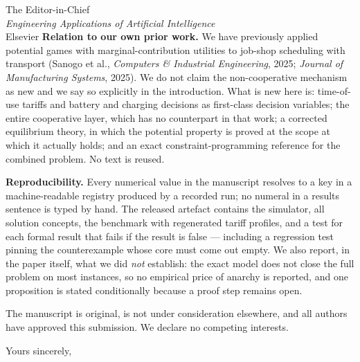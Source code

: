 \documentclass[11pt]{letter}
\begin{document}
\begin{letter}{The Editor-in-Chief\\\textit{Engineering Applications of Artificial Intelligence}\\Elsevier}
\textbf{Relation to our own prior work.} We have previously applied potential games with
marginal-contribution utilities to job-shop scheduling with transport (Sanogo et al.,
\textit{Computers \& Industrial Engineering}, 2025; \textit{Journal of Manufacturing
Systems}, 2025). We do not claim the non-cooperative mechanism as new and we say so
explicitly in the introduction. What is new here is: time-of-use tariffs and battery and
charging decisions as first-class decision variables; the entire cooperative layer, which has
no counterpart in that work; a corrected equilibrium theory, in which the potential property
is proved at the scope at which it actually holds; and an exact constraint-programming
reference for the combined problem. No text is reused.

\textbf{Reproducibility.} Every numerical value in the manuscript resolves to a key in a
machine-readable registry produced by a recorded run; no numeral in a results sentence is
typed by hand. The released artefact contains the simulator, all solution concepts, the
benchmark with regenerated tariff profiles, and a test for each formal result that fails if
the result is false --- including a regression test pinning the counterexample whose core
must come out empty. We also report, in the paper itself, what we did \emph{not} establish:
the exact model does not close the full problem on most instances, so no empirical price of
anarchy is reported, and one proposition is stated conditionally because a proof step remains
open.

The manuscript is original, is not under consideration elsewhere, and all authors have
approved this submission. We declare no competing interests.

\closing{Yours sincerely,}

\end{letter}
\end{document}
